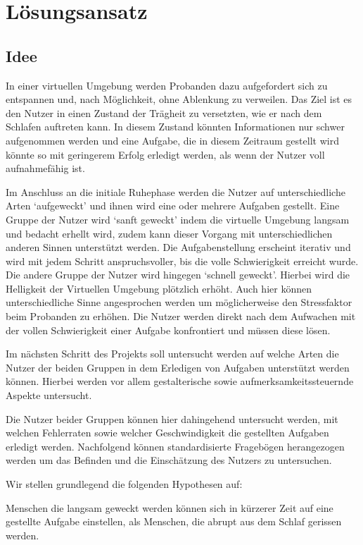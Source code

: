 \chapter{Lösungsansatz}
\section{Idee}
In einer virtuellen Umgebung werden Probanden dazu aufgefordert sich zu entspannen und, nach Möglichkeit, ohne Ablenkung zu verweilen. Das Ziel ist es den Nutzer in einen Zustand der Trägheit zu versetzten, wie er nach dem Schlafen auftreten kann. In diesem Zustand könnten Informationen nur schwer aufgenommen werden und eine Aufgabe, die in diesem Zeitraum gestellt wird könnte so mit geringerem Erfolg erledigt werden, als wenn der Nutzer voll aufnahmefähig ist.

Im Anschluss an die initiale Ruhephase werden die Nutzer auf unterschiedliche Arten `auf\-geweckt' und ihnen wird eine oder mehrere Aufgaben gestellt. Eine Gruppe der Nutzer wird `sanft geweckt' indem die virtuelle Umgebung langsam und bedacht erhellt wird, zudem kann dieser Vorgang mit unterschiedlichen anderen Sinnen unterstützt werden. Die Aufgabenstellung erscheint iterativ und wird mit jedem Schritt anspruchsvoller, bis die volle Schwierigkeit erreicht wurde.
Die andere Gruppe der Nutzer wird hingegen `schnell geweckt'. Hierbei wird die Helligkeit der Virtuellen Umgebung plötzlich erhöht. Auch hier können unterschiedliche Sinne angesprochen werden um möglicherweise den Stressfaktor beim Probanden zu erhöhen. Die Nutzer werden direkt nach dem Aufwachen mit der vollen Schwierigkeit einer Aufgabe konfrontiert und müssen diese lösen.

Im nächsten Schritt des Projekts soll untersucht werden auf welche Arten die Nutzer der beiden Gruppen in dem Erledigen von Aufgaben unterstützt werden können. Hierbei werden vor allem gestalterische sowie aufmerksamkeitssteuernde Aspekte untersucht.

Die Nutzer beider Gruppen können hier dahingehend untersucht werden, mit welchen Fehlerraten sowie welcher Geschwindigkeit die gestellten Aufgaben erledigt werden. Nachfolgend können standardisierte Fragebögen herangezogen werden um das Befinden und die Einschätzung des Nutzers zu untersuchen.

Wir stellen grundlegend die folgenden Hypothesen auf:
\begin{hyp}\label{hyp:schneller}
	Menschen die langsam geweckt werden können sich in kürzerer Zeit auf eine gestellte Aufgabe einstellen, als Menschen, die abrupt aus dem Schlaf gerissen werden.
\end{hyp}

